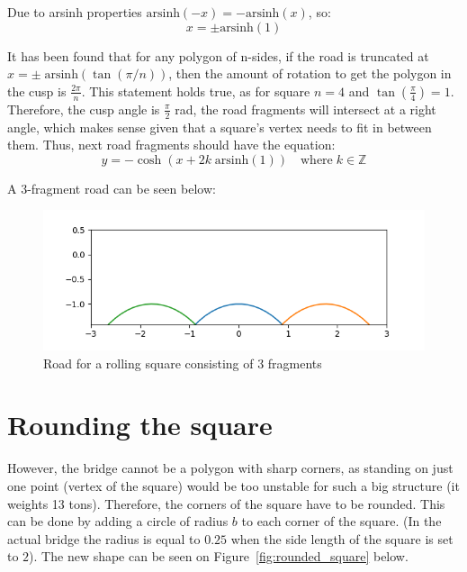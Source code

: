 \documentclass[12pt]{article}
\begin{document}
        Due to arsinh properties $\text{arsinh}(-x) = - \text{arsinh}(x)$, so:
        \begin{equation}
            x = \pm \text{arsinh}(1)
        \end{equation} 

        It has been found that for any polygon of n-sides, if the road is truncated at $x = \pm \; \text{arsinh}(\tan(\pi / n))$, then the amount of rotation to get the polygon in the cusp is $\frac{2\pi}{n}$\cite{Hall_Wagon_1992}. This statement holds true, as for square $n=4$ and $\tan(\frac{\pi}{4}) = 1$. Therefore, the cusp angle is $\frac{\pi}{2}$ rad, the road fragments will intersect at a right angle, which makes sense given that a square's vertex needs to fit in between them. Thus, next road fragments should have the equation\cite{Hall_Wagon_1992}:
        \begin{equation}
            y = - \cosh (x + 2k \;\text{arsinh}(1) ) \quad \text{where}\; k \in \mathbb{Z}
        \end{equation}
        
        A 3-fragment road can be seen below:
        \begin{figure}[H]
            \centering
            \includegraphics[width=\linewidth]{images/road_3.png}
            \caption{Road for a rolling square consisting of 3 fragments}\label{fig:road3}
        \end{figure}

    \section{Rounding the square}

        However, the bridge cannot be a polygon with sharp corners, as standing on just one point (vertex of the square) would be too unstable for such a big structure (it weights 13 tons\cite{bridge_newatlas}). Therefore, the corners of the square have to be rounded. This can be done by adding a circle of radius $b$ to each corner of the square. (In the actual bridge the radius is equal to $0.25$ when the side length of the square is set to $2$). The new shape can be seen on Figure~\ref{fig:rounded_square} below.
\end{document}
